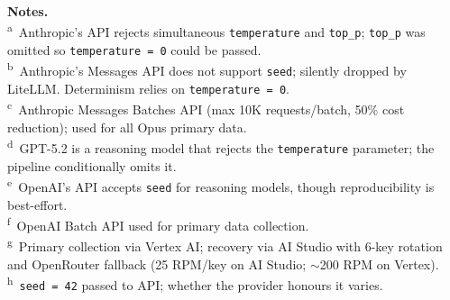 \begin{table}[htbp]
\vspace{4pt}
{\footnotesize
\noindent\textbf{Notes.}\\[2pt]
\textsuperscript{a}~Anthropic's API rejects simultaneous \texttt{temperature} and \texttt{top\_p}; \texttt{top\_p} was omitted so \texttt{temperature\,=\,0} could be passed.\\
\textsuperscript{b}~Anthropic's Messages API does not support \texttt{seed}; silently dropped by LiteLLM.  Determinism relies on \texttt{temperature\,=\,0}.\\
\textsuperscript{c}~Anthropic Messages Batches API (max 10K requests/batch, 50\% cost reduction); used for all Opus primary data.\\
\textsuperscript{d}~GPT-5.2 is a reasoning model that rejects the \texttt{temperature} parameter; the pipeline conditionally omits it.\\
\textsuperscript{e}~OpenAI's API accepts \texttt{seed} for reasoning models, though reproducibility is best-effort.\\
\textsuperscript{f}~OpenAI Batch API used for primary data collection.\\
\textsuperscript{g}~Primary collection via Vertex AI; recovery via AI Studio with 6-key rotation and OpenRouter fallback (25 RPM/key on AI Studio; ${\sim}$200 RPM on Vertex).\\
\textsuperscript{h}~\texttt{seed\,=\,42} passed to API; whether the provider honours it varies.
}
\end{table}



